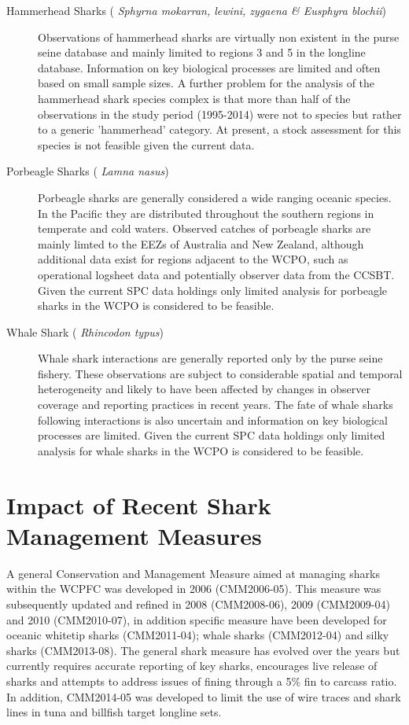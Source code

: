 \documentclass[12pt]{SCreport}
\begin{document}
\begin{description}
\item[ Hammerhead Sharks (\emph{ Sphyrna mokarran, lewini, zygaena \& Eusphyra blochii}) ]  Observations of hammerhead sharks are virtually non existent in the purse seine database and mainly limited to  regions 3 and 5 in the longline database. Information on key biological processes are limited and often based on small sample sizes. A further problem for the analysis of the hammerhead shark species complex is  that more than half of the observations in the study period (1995-2014) were not to species but rather to a generic 'hammerhead' category. At present, a stock assessment for this species is not feasible given the current data.


\item[ Porbeagle Sharks (\emph{ Lamna nasus}) ] Porbeagle sharks are generally considered a wide ranging oceanic species. In the Pacific they are distributed throughout the southern regions in temperate and cold waters.  Observed catches of porbeagle sharks are mainly limted to the EEZs of Australia and New Zealand, although additional data exist for regions adjacent to the WCPO, such as operational logsheet data and  potentially observer data from the CCSBT.  Given the current SPC data holdings only limited analysis for porbeagle sharks in the WCPO is considered to be feasible.

\item[ Whale Shark (\emph{ Rhincodon typus}) ] Whale shark interactions are generally reported only by the purse seine fishery. These observations are subject to considerable spatial and temporal heterogeneity and likely to have been affected by changes in observer coverage and reporting practices in recent years. The fate of whale sharks following interactions is also uncertain and information on key biological processes are limited. Given the current SPC data holdings only limited analysis for whale sharks in the WCPO is considered to be feasible.


\end{description}

\section{Impact of Recent Shark Management Measures}

A general Conservation and Management Measure aimed at managing sharks within the WCPFC was developed in 2006 (CMM2006-05). This measure was subsequently updated and refined in 2008 (CMM2008-06), 2009 (CMM2009-04) and 2010 (CMM2010-07), in addition specific measure have been developed for oceanic whitetip sharks (CMM2011-04); whale sharks (CMM2012-04) and silky sharks (CMM2013-08). The general shark measure has evolved over the years but currently requires accurate reporting of key sharks, encourages live release of sharks and attempts to address issues of fining through a 5\% fin to carcass ratio. In addition, CMM2014-05 was developed to limit the use of wire traces and shark lines in tuna and billfish target longline sets. 
\end{document}

